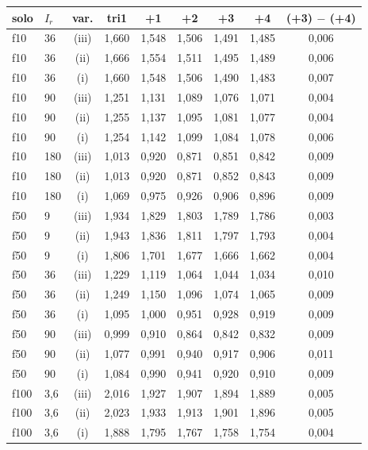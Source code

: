 \begin{tabular}{llc ccccc c}
\toprule
solo & $I_r$ & var. & tri1 & +1 & +2 & +3 & +4 & (+3) $-$ (+4)\\
\midrule
f10 & 36 & (iii) & 1{,}660 & 1{,}548 & 1{,}506 & 1{,}491 & 1{,}485 & 0{,}006\\
f10 & 36 & (ii) & 1{,}666 & 1{,}554 & 1{,}511 & 1{,}495 & 1{,}489 & 0{,}006\\
f10 & 36 & (i) & 1{,}660 & 1{,}548 & 1{,}506 & 1{,}490 & 1{,}483 & 0{,}007\\
f10 & 90 & (iii) & 1{,}251 & 1{,}131 & 1{,}089 & 1{,}076 & 1{,}071 & 0{,}004\\
f10 & 90 & (ii) & 1{,}255 & 1{,}137 & 1{,}095 & 1{,}081 & 1{,}077 & 0{,}004\\
f10 & 90 & (i) & 1{,}254 & 1{,}142 & 1{,}099 & 1{,}084 & 1{,}078 & 0{,}006\\
f10 & 180 & (iii) & 1{,}013 & 0{,}920 & 0{,}871 & 0{,}851 & 0{,}842 & 0{,}009\\
f10 & 180 & (ii) & 1{,}013 & 0{,}920 & 0{,}871 & 0{,}852 & 0{,}843 & 0{,}009\\
f10 & 180 & (i) & 1{,}069 & 0{,}975 & 0{,}926 & 0{,}906 & 0{,}896 & 0{,}009\\
\midrule
f50 & 9 & (iii) & 1{,}934 & 1{,}829 & 1{,}803 & 1{,}789 & 1{,}786 & 0{,}003\\
f50 & 9 & (ii) & 1{,}943 & 1{,}836 & 1{,}811 & 1{,}797 & 1{,}793 & 0{,}004\\
f50 & 9 & (i) & 1{,}806 & 1{,}701 & 1{,}677 & 1{,}666 & 1{,}662 & 0{,}004\\
f50 & 36 & (iii) & 1{,}229 & 1{,}119 & 1{,}064 & 1{,}044 & 1{,}034 & 0{,}010\\
f50 & 36 & (ii) & 1{,}249 & 1{,}150 & 1{,}096 & 1{,}074 & 1{,}065 & 0{,}009\\
f50 & 36 & (i) & 1{,}095 & 1{,}000 & 0{,}951 & 0{,}928 & 0{,}919 & 0{,}009\\
f50 & 90 & (iii) & 0{,}999 & 0{,}910 & 0{,}864 & 0{,}842 & 0{,}832 & 0{,}009\\
f50 & 90 & (ii) & 1{,}077 & 0{,}991 & 0{,}940 & 0{,}917 & 0{,}906 & 0{,}011\\
f50 & 90 & (i) & 1{,}084 & 0{,}990 & 0{,}941 & 0{,}920 & 0{,}910 & 0{,}009\\
\midrule
f100 & 3{,}6 & (iii) & 2{,}016 & 1{,}927 & 1{,}907 & 1{,}894 & 1{,}889 & 0{,}005\\
f100 & 3{,}6 & (ii) & 2{,}023 & 1{,}933 & 1{,}913 & 1{,}901 & 1{,}896 & 0{,}005\\
f100 & 3{,}6 & (i) & 1{,}888 & 1{,}795 & 1{,}767 & 1{,}758 & 1{,}754 & 0{,}004\\

\end{tabular}
